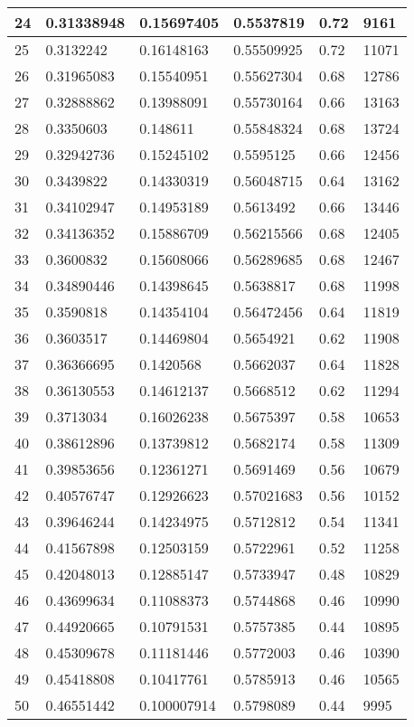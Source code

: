 \begin{longtable}{|l|l|l|l|l|l|}
24 & 0.31338948 & 0.15697405 & 0.5537819 & 0.72 & 9161 \\ \hline 
25 & 0.3132242 & 0.16148163 & 0.55509925 & 0.72 & 11071 \\ \hline 
26 & 0.31965083 & 0.15540951 & 0.55627304 & 0.68 & 12786 \\ \hline 
27 & 0.32888862 & 0.13988091 & 0.55730164 & 0.66 & 13163 \\ \hline 
28 & 0.3350603 & 0.148611 & 0.55848324 & 0.68 & 13724 \\ \hline 
29 & 0.32942736 & 0.15245102 & 0.5595125 & 0.66 & 12456 \\ \hline 
30 & 0.3439822 & 0.14330319 & 0.56048715 & 0.64 & 13162 \\ \hline 
31 & 0.34102947 & 0.14953189 & 0.5613492 & 0.66 & 13446 \\ \hline 
32 & 0.34136352 & 0.15886709 & 0.56215566 & 0.68 & 12405 \\ \hline 
33 & 0.3600832 & 0.15608066 & 0.56289685 & 0.68 & 12467 \\ \hline 
34 & 0.34890446 & 0.14398645 & 0.5638817 & 0.68 & 11998 \\ \hline 
35 & 0.3590818 & 0.14354104 & 0.56472456 & 0.64 & 11819 \\ \hline 
36 & 0.3603517 & 0.14469804 & 0.5654921 & 0.62 & 11908 \\ \hline 
37 & 0.36366695 & 0.1420568 & 0.5662037 & 0.64 & 11828 \\ \hline 
38 & 0.36130553 & 0.14612137 & 0.5668512 & 0.62 & 11294 \\ \hline 
39 & 0.3713034 & 0.16026238 & 0.5675397 & 0.58 & 10653 \\ \hline 
40 & 0.38612896 & 0.13739812 & 0.5682174 & 0.58 & 11309 \\ \hline 
41 & 0.39853656 & 0.12361271 & 0.5691469 & 0.56 & 10679 \\ \hline 
42 & 0.40576747 & 0.12926623 & 0.57021683 & 0.56 & 10152 \\ \hline 
43 & 0.39646244 & 0.14234975 & 0.5712812 & 0.54 & 11341 \\ \hline 
44 & 0.41567898 & 0.12503159 & 0.5722961 & 0.52 & 11258 \\ \hline 
45 & 0.42048013 & 0.12885147 & 0.5733947 & 0.48 & 10829 \\ \hline 
46 & 0.43699634 & 0.11088373 & 0.5744868 & 0.46 & 10990 \\ \hline 
47 & 0.44920665 & 0.10791531 & 0.5757385 & 0.44 & 10895 \\ \hline 
48 & 0.45309678 & 0.11181446 & 0.5772003 & 0.46 & 10390 \\ \hline 
49 & 0.45418808 & 0.10417761 & 0.5785913 & 0.46 & 10565 \\ \hline 
50 & 0.46551442 & 0.100007914 & 0.5798089 & 0.44 & 9995 \\ \hline 
\end{longtable}